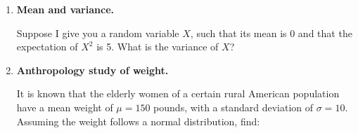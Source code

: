 \documentclass[12pt]{article}
\newif\ifsolutions
\begin{document}
\begin{enumerate}
\begin{enumerate}
        \item While the probability of finding a "psychic" increases with the sample size, this does not mean that psychic ability actually exists. 
        \begin{itemize}
            \item In any large enough sample, \textbf{rare events happen by chance}.
            \item The correct way to test the existence of psychic abilities is not to rely on a single lucky individual, but rather to analyze whether successful test-takers continue to systematically outperform chance across repeated experiments. 
            \item True psychics should consistently perform above chance levels, while lucky individuals who guessed well should regress to the mean in future trials.
            \item When testing collective, the threshold number of people who test positive for psychic abilities to consider that psychic abilities exist should increase along with the sample size.    
        \end{itemize}
    \end{enumerate}
    
    \fi \color{black}

    \item \textbf{Mean and variance.}
    
    Suppose I give you a random variable $X$, such that its mean is 0 and that the expectation of $X^2$ is 5. What is the variance of $X$?
    
    \ifsolutions \color{blue} \textbf{Solution:} \\
    
    \fi \color{black}
    

    \item \textbf{Anthropology study of weight.}
    
    It is known that the elderly women of a certain rural American population have a mean weight of \( \mu = 150 \) pounds, with a standard deviation of \( \sigma = 10 \). Assuming the weight follows a normal distribution, find:


\end{enumerate}
\end{document}
